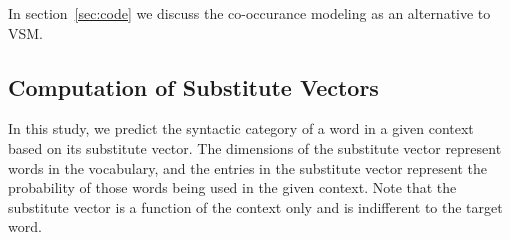 In section~\ref{sec:code} we discuss the co-occurance modeling as an
alternative to VSM.

\subsection{Computation of Substitute Vectors}
\label{sec:subcomp}

In this study, we predict the syntactic category of a word in a given
context based on its substitute vector.  The dimensions of the
substitute vector represent words in the vocabulary, and the entries
in the substitute vector represent the probability of those words
being used in the given context.  Note that the substitute vector is a
function of the context only and is indifferent to the target word.



